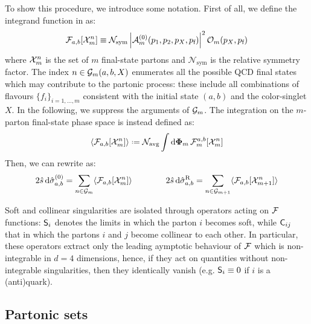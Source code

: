 To show this procedure, we introduce some notation. First of all, we define the integrand function in  as:
\begin{equation}
  \mathcal{F}_{a,b}[\mathcal{X}^{n}_{m}] \equiv \mathcal{N}_\text{sym} \left\lvert\mathcal{A}_m^{(0)}(p_1, p_2, p_X, p_\text{f})\right\rvert^2 \mathcal{O}_m(p_X, p_\text{f})
\end{equation}
where $ \mathcal{X}^{n}_{m} $ is the set of $ m $ final-state partons and $ \mathcal{N}_\text{sym} $ is the relative symmetry factor. The index $ n \in \mathcal{G}_m(a,b,X) $ enumerates all the possible QCD final states which may contribute to the partonic process: these include all combinations of flavours $ \{f_i\}_{i = 1,\dots,m} $ consistent with the initial state $ (a,b) $ and the color-singlet $ X $. In the following, we suppress the arguments of $ \mathcal{G}_m $. The integration on the $ m $-parton final-state phase space is instead defined as:
\begin{equation}
  \ips{\flm_{a,b}[\fs{n}{m}]} \defeq \navg \int \lps_m \, \flm_m^{a,b}[\fs{n}{m}]
\end{equation}
Then, we can rewrite  as:
\begin{equation}
  2\hat{s}\, \mathrm{d}\hat{\sigma}_{a,b}^{(0)} = \sum_{n \in \mathcal{G}_m} \langle \mathcal{F}_{a,b}[\mathcal{X}^{n}_{m}] \rangle
  \qquad \qquad
  2\hat{s}\, \mathrm{d}\hat{\sigma}_{a,b}^\text{R} = \sum_{n \in \mathcal{G}_{m+1}} \langle \mathcal{F}_{a,b}[\mathcal{X}^{n}_{m+1}] \rangle
  \label{eq:lo-real}
\end{equation}

Soft and collinear singularities are isolated through operators acting on $ \mathcal{F} $ functions: $ \mathsf{S}_i $ denotes the limits in which the parton $ i $ becomes soft, while $ \mathsf{C}_{ij} $ that in which the partons $ i $ and $ j $ become collinear to each other. In particular, these operators extract only the leading aymptotic behaviour of $ \mathcal{F} $ which is non-integrable in $ d = 4 $ dimensions, hence, if they act on quantities without non-integrable singularities, then they identically vanish (e.g. $ \mathsf{S}_i \equiv 0 $ if $ i $ is a (anti)quark).

\subsection{Partonic sets}

